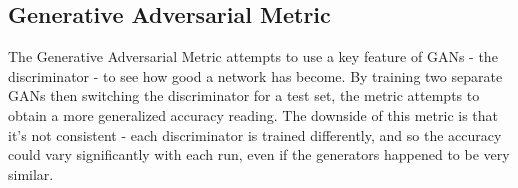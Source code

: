 \subsection{Generative Adversarial Metric}
\label{sub:generative_adversarial_metric}

The Generative Adversarial Metric attempts to use a key feature of GANs - the discriminator - to see how good a network has become. 
By training two separate GANs then switching the discriminator for a test set, the metric attempts to obtain a more generalized accuracy reading.\cite{im2016generative}
The downside of this metric is that it's not consistent - each discriminator is trained differently, and so the accuracy could vary significantly with each run, even if the generators happened to be very similar.